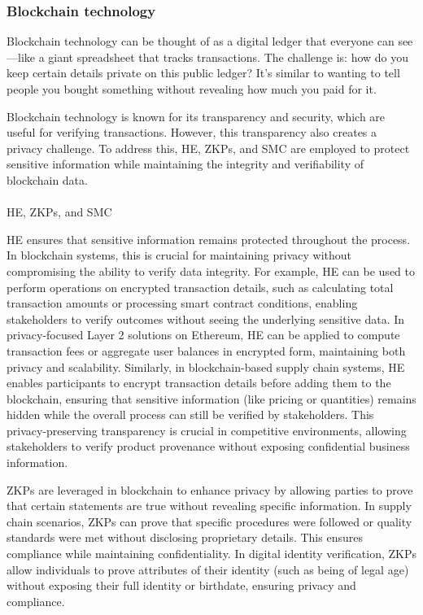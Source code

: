 \documentclass[
  letterpaper,
  DIV=11,
  numbers=noendperiod,
  oneside]{scrartcl}
\makeatletter
\let\oldparagraph\paragraph
\renewcommand{\paragraph}{
    \@ifstar
      \xxxParagraphStar
      \xxxParagraphNoStar
  }
\newcommand{\xxxParagraphStar}[1]{\oldparagraph*{#1}\mbox{}}
\newcommand{\xxxParagraphNoStar}[1]{\oldparagraph{#1}\mbox{}}
\makeatother
\begin{document}
\subsubsection{Blockchain technology}\label{blockchain-technology}

Blockchain technology can be thought of as a digital ledger that
everyone can see---like a giant spreadsheet that tracks transactions.
The challenge is: how do you keep certain details private on this public
ledger? It's similar to wanting to tell people you bought something
without revealing how much you paid for it.

Blockchain technology is known for its transparency and security, which
are useful for verifying transactions. However, this transparency also
creates a privacy challenge. To address this, HE, ZKPs, and SMC are
employed to protect sensitive information while maintaining the
integrity and verifiability of blockchain data.

\paragraph{HE, ZKPs, and SMC}\label{he-zkps-and-smc}

HE ensures that sensitive information remains protected throughout the
process. In blockchain systems, this is crucial for maintaining privacy
without compromising the ability to verify data integrity. For example,
HE can be used to perform operations on encrypted transaction details,
such as calculating total transaction amounts or processing smart
contract conditions, enabling stakeholders to verify outcomes without
seeing the underlying sensitive data. In privacy-focused Layer 2
solutions on Ethereum, HE can be applied to compute transaction fees or
aggregate user balances in encrypted form, maintaining both privacy and
scalability. Similarly, in blockchain-based supply chain systems, HE
enables participants to encrypt transaction details before adding them
to the blockchain, ensuring that sensitive information (like pricing or
quantities) remains hidden while the overall process can still be
verified by stakeholders. This privacy-preserving transparency is
crucial in competitive environments, allowing stakeholders to verify
product provenance without exposing confidential business information.

ZKPs are leveraged in blockchain to enhance privacy by allowing parties
to prove that certain statements are true without revealing specific
information. In supply chain scenarios, ZKPs can prove that specific
procedures were followed or quality standards were met without
disclosing proprietary details. This ensures compliance while
maintaining confidentiality. In digital identity verification, ZKPs
allow individuals to prove attributes of their identity (such as being
of legal age) without exposing their full identity or birthdate,
ensuring privacy and compliance.
\end{document}
